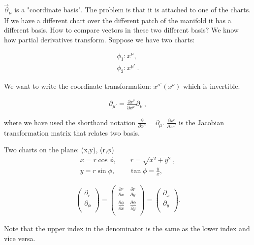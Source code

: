 \documentclass[11pt]{article}
\begin{document}
$\vec{\partial }_\mu$ is a "coordinate basis". The problem is that it is attached to one of the charts. If we have a different chart over the different patch of the manifold it has a different basis. How to compare vectors in these two different basis? We know how partial derivatives transform. Suppose we have two charts:

\begin{align*}
\phi_1 : x^\mu ,\ \\
\phi_2 : x^{\mu'}  \ .
\end{align*}


We want to write the coordinate transformation:  $x^{\mu'}(x^\nu)$ which is invertible.

\begin{align}
\partial_{\mu'}= \frac{\partial x^\nu}{\partial x^{\mu'}}\partial_\nu  \ ,
\end{align}

where we have used the shorthand notation $\frac{\partial}{\partial x^\mu} = \partial_\mu$.
$\frac{\partial x^\nu}{\partial x^{\mu'}}$ is the Jacobian transformation matrix that relates two basis.

 \begin{example}
 Two charts on the plane:
  (x,y), (r,$\phi$) 
  \begin{align*}
   x = r\cos\phi ,   \qquad  r = \sqrt{x^2 + y^2}  \ , \\
   y = r\sin\phi ,  \qquad   \tan\phi = \frac{y}{x} , \
  \end{align*}
 
  \begin{align}
  \begin{pmatrix}
           \partial_r \\
           \partial_\phi \\
         \end{pmatrix} =
  \begin{pmatrix}
                        \frac{\partial r}{\partial x}  &  \frac{\partial r}{\partial y}  \\
                        \frac{\partial \phi}{\partial x}  &  \frac{\partial \phi}{\partial y}\\
                        \end{pmatrix} =
                          \begin{pmatrix}
           \partial_x \\
           \partial_y \\
         \end{pmatrix} .
  \end{align}
\end{example}
Note that the upper index in the denominator is the same as the lower index and vice versa.
\end{document}
